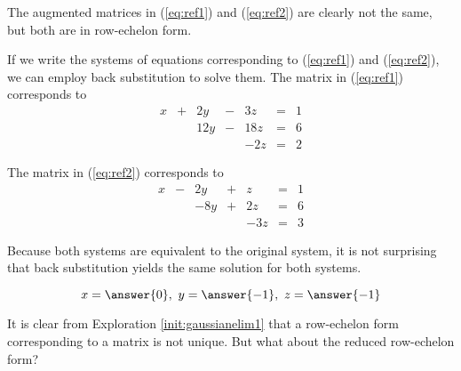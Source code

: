 \documentclass{ximera}
\begin{document}
\begin{exploration}
The augmented matrices in (\ref{eq:ref1}) and (\ref{eq:ref2}) are clearly not the same, but both are in row-echelon form.
 
If we write the systems of equations corresponding to (\ref{eq:ref1}) and (\ref{eq:ref2}), we can employ back substitution to solve them.  The matrix in (\ref{eq:ref1}) corresponds to
$$\begin{array}{ccccccccc}
      x &+ &2y&-&3z&= &1 \\
     & &12y&-&18z&=&6\\
      &&&&-2z&=&2
    \end{array}$$
     
The matrix in (\ref{eq:ref2}) corresponds to   
$$\begin{array}{ccccccccc}
      x &- &2y&+&z&= &1 \\
     & &-8y&+&2z&=&6\\
      &&&&-3z&=&3
    \end{array}$$
     
Because both systems are equivalent to the original system, it is not surprising that back substitution yields the same solution for both systems.
 
$$x=\answer{0},\quad y=\answer{-1},\quad z=\answer{-1}$$
 
\end{exploration}
 
It is clear from Exploration \ref{init:gaussianelim1} that a row-echelon form corresponding to a matrix is not unique.  But what about the reduced row-echelon form?
 
\end{document}

